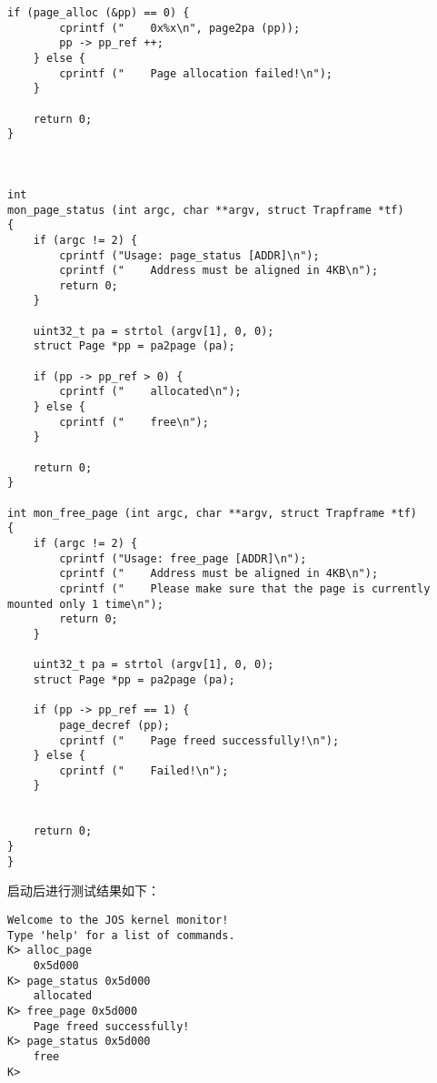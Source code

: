 \documentclass{article}
\begin{document}
\begin{CJK*}{UTF8}{gkai}
\begin{lstlisting}[style=ccode, title={\scriptsize \ttfamily \bfseries kern/monitor.c}]
    if (page_alloc (&pp) == 0) {
        cprintf ("    0x%x\n", page2pa (pp));
        pp -> pp_ref ++;
    } else {
        cprintf ("    Page allocation failed!\n");
    }

    return 0;
}



int 
mon_page_status (int argc, char **argv, struct Trapframe *tf)
{
    if (argc != 2) {
        cprintf ("Usage: page_status [ADDR]\n");
        cprintf ("    Address must be aligned in 4KB\n");
        return 0;
    }

    uint32_t pa = strtol (argv[1], 0, 0);
    struct Page *pp = pa2page (pa);

    if (pp -> pp_ref > 0) {
        cprintf ("    allocated\n");
    } else {
        cprintf ("    free\n");
    }

    return 0;
}

int mon_free_page (int argc, char **argv, struct Trapframe *tf)
{
    if (argc != 2) {
        cprintf ("Usage: free_page [ADDR]\n");
        cprintf ("    Address must be aligned in 4KB\n");
        cprintf ("    Please make sure that the page is currently mounted only 1 time\n");
        return 0;
    }

    uint32_t pa = strtol (argv[1], 0, 0);
    struct Page *pp = pa2page (pa);

    if (pp -> pp_ref == 1) {
        page_decref (pp);
        cprintf ("    Page freed successfully!\n");
    } else {
        cprintf ("    Failed!\n");
    }

   
    return 0;
}
}
\end{lstlisting}

启动后进行测试结果如下：

\begin{lstlisting}[style=console]
Welcome to the JOS kernel monitor!
Type 'help' for a list of commands.
K> alloc_page
    0x5d000
K> page_status 0x5d000
    allocated
K> free_page 0x5d000
    Page freed successfully!
K> page_status 0x5d000
    free
K> 
\end{lstlisting}

\clearpage

\end{CJK*}
\end{document}
